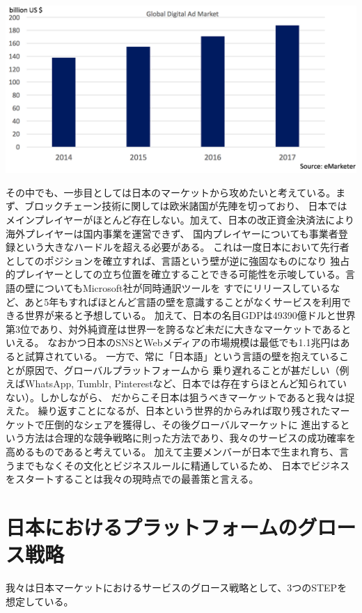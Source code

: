 \documentclass{jsarticle}
\begin{document}
\begin{center}
	\includegraphics[scale=0.4]{img/digitalad-marketsize.png}
\end{center}

その中でも、一歩目としては日本のマーケットから攻めたいと考えている。まず、ブロックチェーン技術に関しては欧米諸国が先陣を切っており、
日本ではメインプレイヤーがほとんど存在しない。加えて、日本の改正資金決済法により海外プレイヤーは国内事業を運営できず、
国内プレイヤーについても事業者登録という大きなハードルを超える必要がある。
これは一度日本において先行者としてのポジションを確立すれば、言語という壁が逆に強固なものになり
独占的プレイヤーとしての立ち位置を確立することできる可能性を示唆している。言語の壁についてもMicrosoft社が同時通訳ツールを
すでにリリースしているなど、あと5年もすればほとんど言語の壁を意識することがなくサービスを利用できる世界が来ると予想している。
加えて、日本の名目GDPは49390億ドルと世界第3位であり、対外純資産は世界一を誇るなど未だに大きなマーケットであるといえる。
なおかつ日本のSNSとWebメディアの市場規模は最低でも1.1兆円はあると試算されている。
一方で、常に「日本語」という言語の壁を抱えていることが原因で、グローバルプラットフォームから
乗り遅れることが甚だしい（例えばWhatsApp, Tumblr, Pinterestなど、日本では存在すらほとんど知られていない）。しかしながら、
だからこそ日本は狙うべきマーケットであると我々は捉えた。
繰り返すことになるが、日本という世界的からみれば取り残されたマーケットで圧倒的なシェアを獲得し、その後グローバルマーケットに
進出するという方法は合理的な競争戦略に則った方法であり、我々のサービスの成功確率を高めるものであると考えている。
加えて主要メンバーが日本で生まれ育ち、言うまでもなくその文化とビジネスルールに精通しているため、
日本でビジネスをスタートすることは我々の現時点での最善策と言える。
\section{日本におけるプラットフォームのグロース戦略}
我々は日本マーケットにおけるサービスのグロース戦略として、3つのSTEPを想定している。
\end{document}
